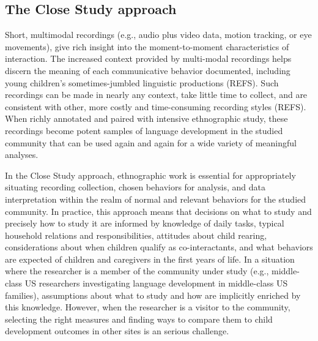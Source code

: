 \documentclass[,man,floatsintext]{apa6}
\begin{document}
\subsection{The Close Study approach}\label{the-close-study-approach}

Short, multimodal recordings (e.g., audio plus video data, motion
tracking, or eye movements), give rich insight into the moment-to-moment
characteristics of interaction. The increased context provided by
multi-modal recordings helps discern the meaning of each communicative
behavior documented, including young children's sometimes-jumbled
linguistic productions (REFS). Such recordings can be made in nearly any
context, take little time to collect, and are consistent with other,
more costly and time-consuming recording styles (REFS). When richly
annotated and paired with intensive ethnographic study, these recordings
become potent samples of language development in the studied community
that can be used again and again for a wide variety of meaningful
analyses.

In the Close Study approach, ethnographic work is essential for
appropriately situating recording collection, chosen behaviors for
analysis, and data interpretation within the realm of normal and
relevant behaviors for the studied community. In practice, this approach
means that decisions on what to study and precisely how to study it are
informed by knowledge of daily tasks, typical household relations and
responsibilities, attitudes about child rearing, considerations about
when children qualify as co-interactants, and what behaviors are
expected of children and caregivers in the first years of life. In a
situation where the researcher is a member of the community under study
(e.g., middle-class US researchers investigating language development in
middle-class US families), assumptions about what to study and how are
implicitly enriched by this knowledge. However, when the researcher is a
visitor to the community, selecting the right measures and finding ways
to compare them to child development outcomes in other sites is an
serious challenge.
\end{document}
